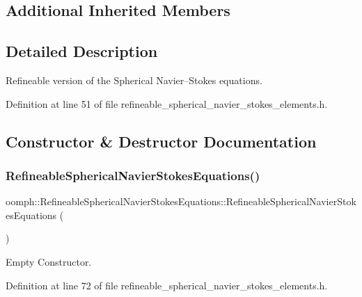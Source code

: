 \subsection*{Additional Inherited Members}


\subsection{Detailed Description}
Refineable version of the Spherical Navier--Stokes equations. 

Definition at line 51 of file refineable\+\_\+spherical\+\_\+navier\+\_\+stokes\+\_\+elements.\+h.



\subsection{Constructor \& Destructor Documentation}
\mbox{\label{classoomph_1_1RefineableSphericalNavierStokesEquations_a110ee3e26c415f5ce0b242c810365635}} 
\subsubsection{\texorpdfstring{Refineable\+Spherical\+Navier\+Stokes\+Equations()}{RefineableSphericalNavierStokesEquations()}}
{\footnotesize\ttfamily oomph\+::\+Refineable\+Spherical\+Navier\+Stokes\+Equations\+::\+Refineable\+Spherical\+Navier\+Stokes\+Equations (\begin{DoxyParamCaption}{ }\end{DoxyParamCaption})\hspace{0.3cm}{\ttfamily [inline]}}



Empty Constructor. 



Definition at line 72 of file refineable\+\_\+spherical\+\_\+navier\+\_\+stokes\+\_\+elements.\+h.



